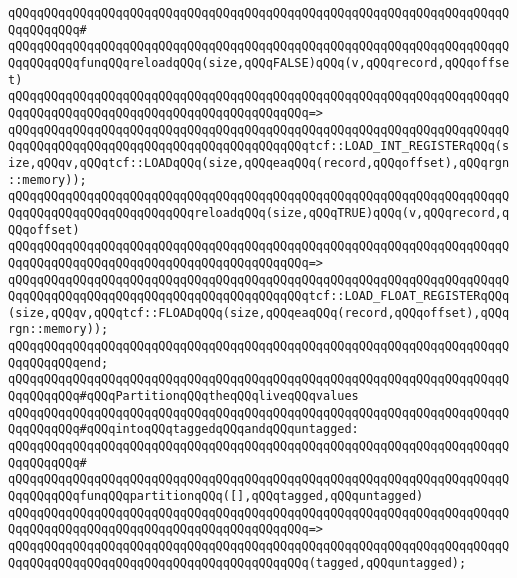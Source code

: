 \verb|qQQqqQQqqQQqqQQqqQQqqQQqqQQqqQQqqQQqqQQqqQQqqQQqqQQqqQQqqQQqqQQqqQQqqQQqqQQqqQQq#|\newline
\verb|qQQqqQQqqQQqqQQqqQQqqQQqqQQqqQQqqQQqqQQqqQQqqQQqqQQqqQQqqQQqqQQqqQQqqQQqqQQqqQQqfunqQQqreloadqQQq(size,qQQqFALSE)qQQq(v,qQQqrecord,qQQqoffset)|\newline
\verb|qQQqqQQqqQQqqQQqqQQqqQQqqQQqqQQqqQQqqQQqqQQqqQQqqQQqqQQqqQQqqQQqqQQqqQQqqQQqqQQqqQQqqQQqqQQqqQQqqQQqqQQqqQQqqQQq=>|\newline
\verb|qQQqqQQqqQQqqQQqqQQqqQQqqQQqqQQqqQQqqQQqqQQqqQQqqQQqqQQqqQQqqQQqqQQqqQQqqQQqqQQqqQQqqQQqqQQqqQQqqQQqqQQqqQQqqQQqtcf::LOAD_INT_REGISTERqQQq(size,qQQqv,qQQqtcf::LOADqQQq(size,qQQqeaqQQq(record,qQQqoffset),qQQqrgn::memory));|\newline
\newline
\verb|qQQqqQQqqQQqqQQqqQQqqQQqqQQqqQQqqQQqqQQqqQQqqQQqqQQqqQQqqQQqqQQqqQQqqQQqqQQqqQQqqQQqqQQqqQQqqQQqreloadqQQq(size,qQQqTRUE)qQQq(v,qQQqrecord,qQQqoffset)|\newline
\verb|qQQqqQQqqQQqqQQqqQQqqQQqqQQqqQQqqQQqqQQqqQQqqQQqqQQqqQQqqQQqqQQqqQQqqQQqqQQqqQQqqQQqqQQqqQQqqQQqqQQqqQQqqQQqqQQq=>|\newline
\verb|qQQqqQQqqQQqqQQqqQQqqQQqqQQqqQQqqQQqqQQqqQQqqQQqqQQqqQQqqQQqqQQqqQQqqQQqqQQqqQQqqQQqqQQqqQQqqQQqqQQqqQQqqQQqqQQqtcf::LOAD_FLOAT_REGISTERqQQq(size,qQQqv,qQQqtcf::FLOADqQQq(size,qQQqeaqQQq(record,qQQqoffset),qQQqrgn::memory));|\newline
\verb|qQQqqQQqqQQqqQQqqQQqqQQqqQQqqQQqqQQqqQQqqQQqqQQqqQQqqQQqqQQqqQQqqQQqqQQqqQQqqQQqend;|\newline
\newline
\newline
\verb|qQQqqQQqqQQqqQQqqQQqqQQqqQQqqQQqqQQqqQQqqQQqqQQqqQQqqQQqqQQqqQQqqQQqqQQqqQQqqQQq#qQQqPartitionqQQqtheqQQqliveqQQqvalues|\newline
\verb|qQQqqQQqqQQqqQQqqQQqqQQqqQQqqQQqqQQqqQQqqQQqqQQqqQQqqQQqqQQqqQQqqQQqqQQqqQQqqQQq#qQQqintoqQQqtaggedqQQqandqQQquntagged:|\newline
\verb|qQQqqQQqqQQqqQQqqQQqqQQqqQQqqQQqqQQqqQQqqQQqqQQqqQQqqQQqqQQqqQQqqQQqqQQqqQQqqQQq#|\newline
\verb|qQQqqQQqqQQqqQQqqQQqqQQqqQQqqQQqqQQqqQQqqQQqqQQqqQQqqQQqqQQqqQQqqQQqqQQqqQQqqQQqfunqQQqpartitionqQQq([],qQQqtagged,qQQquntagged)|\newline
\verb|qQQqqQQqqQQqqQQqqQQqqQQqqQQqqQQqqQQqqQQqqQQqqQQqqQQqqQQqqQQqqQQqqQQqqQQqqQQqqQQqqQQqqQQqqQQqqQQqqQQqqQQqqQQqqQQq=>|\newline
\verb|qQQqqQQqqQQqqQQqqQQqqQQqqQQqqQQqqQQqqQQqqQQqqQQqqQQqqQQqqQQqqQQqqQQqqQQqqQQqqQQqqQQqqQQqqQQqqQQqqQQqqQQqqQQqqQQq(tagged,qQQquntagged);|\newline
